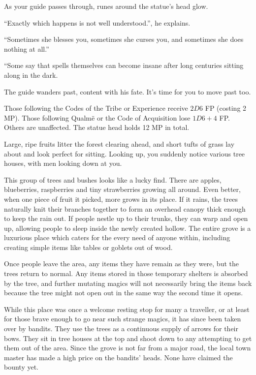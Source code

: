 \begin{multicols}{2}
\begin{boxtext}
	As your guide passes through, runes around the statue's head glow.

	``Exactly which happens is not well understood.'', he explains.

	``Sometimes she blesses you, sometimes she curses you, and sometimes she does nothing at all.''

	``Some say that spells themselves can become insane after long centuries sitting along in the dark.

	The guide wanders past, content with his fate.
	It's time for you to move past too.

\end{boxtext}

Those following the Codes of the Tribe or Experience receive $2D6$ FP (costing 2 MP).
Those following Qualm\"{e} or the Code of Acquisition lose $1D6+4$ FP.
Others are unaffected.
The statue head holds 12 MP in total.


\begin{boxtext}

	Large, ripe fruits litter the forest clearing ahead, and short tufts of grass lay about and look perfect for sitting.
	Looking up, you suddenly notice various tree houses, with men looking down at you.

\end{boxtext}

This group of trees and bushes looks like a lucky find.  There are apples, blueberries, raspberries and tiny strawberries growing all around.  Even better, when one piece of fruit it picked, more grows in its place.  If it rains, the trees naturally knit their branches together  to form an overhead canopy thick enough to keep the rain out.  If people nestle up to their trunks, they can warp and open up, allowing people to sleep inside the newly created hollow.  The entire grove is a luxurious place which caters for the every need of anyone within, including creating simple items like tables or goblets out of wood.

Once people leave the area, any items they have remain as they were, but the trees return to normal.  Any items stored in those temporary shelters is absorbed by the tree, and further mutating magics will not necessarily bring the items back because the tree might not open out in the same way the second time it opens.

While this place was once a welcome resting stop for many a traveller, or at least for those brave enough to go near such strange magics, it has since been taken over by bandits.
They use the trees as a continuous supply of arrows for their bows.
They sit in tree houses at the top and shoot down to any attempting to get them out of the area.
Since the grove is not far from a major road, the local town master has made a high price on the bandits' heads.
None have claimed the bounty yet.


\end{multicols}
